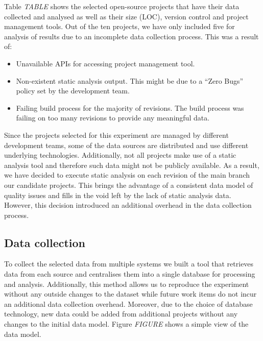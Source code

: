 \documentclass{mpaper}
\begin{document}
Table \emph{TABLE} shows the selected open-source projects that have their data
collected and analysed as well as their size (LOC), version control and project
management tools. Out of the ten projects, we have only included five for
analysis of results due to an incomplete data collection process. This was a
result of:

\begin{itemize}
  \item Unavailable APIs for accessing project management tool.
  \item Non-existent static analysis output. This might be due to a ``Zero
  Bugs'' policy set by the development team.
  \item Failing build process for the majority of revisions. The build process
  was failing on too many revisions to provide any meaningful data.
\end{itemize}

Since the projects selected for this experiment are managed by different
development teams, some of the data sources are distributed and use different
underlying technologies. Additionally, not all projects make use of a static
analysis tool and therefore such data might not be publicly available. As a
result, we have decided to execute static analysis on each revision of the main
branch our candidate projects. This brings the advantage of a consistent data
model of quality issues and fills in the void left by the lack of static
analysis data. However, this decision introduced an additional overhead in the
data collection process.

\subsection{Data collection}
\label{data-collection}

To collect the selected data from multiple systems we built a tool that
retrieves data from each source and centralises them into a single database for
processing and analysis. Additionally, this method allows us to reproduce the
experiment without any outside changes to the dataset while future work items do
not incur an additional data collection overhead. Moreover, due to the choice of
database technology, new data could be added from additional projects without
any changes to the initial data model. Figure \emph{FIGURE} shows a simple view
of the data model.
\end{document}

